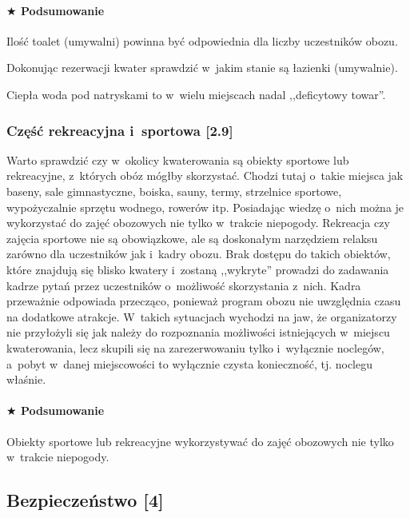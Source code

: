\documentclass[a5paper,10pt,titlepage,twoside]{article}
\newcommand*{\thecheckbox}{\hss$\Box$} %
\newenvironment*{checklist}
{\list{}{%
\renewcommand*{\makelabel}[1]{\thecheckbox}}}
{\endlist}
\begin{document}
\paragraph{$\bigstar$ Podsumowanie}
\begin{checklist}
\item Ilość toalet (umywalni) powinna być odpowiednia dla liczby uczestników obozu.
\item Dokonując rezerwacji kwater sprawdzić w~jakim stanie są łazienki (umywalnie).
\item Ciepła woda pod natryskami to w~wielu miejscach nadal ,,deficytowy towar''.
\end{checklist}

\subsubsection{Część rekreacyjna i~sportowa [2.9]}
Warto sprawdzić czy w~okolicy kwaterowania są obiekty sportowe lub rekreacyjne, z~których obóz mógłby skorzystać. Chodzi tutaj o~takie miejsca jak baseny, sale gimnastyczne, boiska, sauny, termy, strzelnice sportowe, wypożyczalnie sprzętu wodnego, rowerów itp. Posiadając wiedzę o~nich można je wykorzystać do zajęć obozowych nie tylko w~trakcie niepogody. Rekreacja czy zajęcia sportowe nie są obowiązkowe, ale są doskonałym narzędziem relaksu zarówno dla uczestników jak i~kadry obozu. Brak dostępu do takich obiektów, które znajdują się blisko kwatery i~zostaną ,,wykryte'' prowadzi do zadawania kadrze pytań przez uczestników o~możliwość skorzystania z~nich. Kadra przeważnie odpowiada przecząco, ponieważ program obozu nie uwzględnia czasu na dodatkowe atrakcje. W~takich sytuacjach wychodzi na jaw, że organizatorzy nie przyłożyli się jak należy do rozpoznania możliwości istniejących w~miejscu kwaterowania, lecz skupili się na zarezerwowaniu tylko i~wyłącznie noclegów, a~pobyt w~danej miejscowości to wyłącznie czysta konieczność, tj. noclegu właśnie.

\paragraph{$\bigstar$ Podsumowanie}
\begin{checklist}
\item Obiekty sportowe lub rekreacyjne wykorzystywać do zajęć obozowych nie tylko w~trakcie niepogody.
\end{checklist}

\subsection{Bezpieczeństwo [4]}
\end{document}
